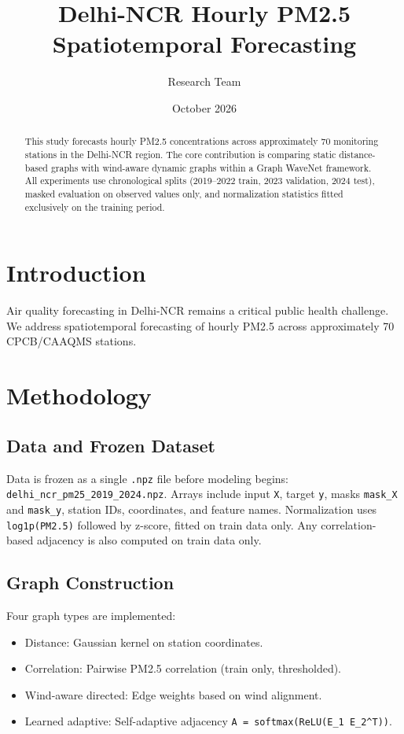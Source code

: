 \documentclass[11pt,a4paper]{article}
\title{Delhi-NCR Hourly PM2.5 Spatiotemporal Forecasting}
\author{Research Team}
\date{October 2026}
\begin{document}
\maketitle

\begin{abstract}
This study forecasts hourly PM2.5 concentrations across approximately 70 monitoring stations in the Delhi-NCR region. The core contribution is comparing static distance-based graphs with wind-aware dynamic graphs within a Graph WaveNet framework. All experiments use chronological splits (2019--2022 train, 2023 validation, 2024 test), masked evaluation on observed values only, and normalization statistics fitted exclusively on the training period.
\end{abstract}

\section{Introduction}

Air quality forecasting in Delhi-NCR remains a critical public health challenge. We address spatiotemporal forecasting of hourly PM2.5 across approximately 70 CPCB/CAAQMS stations.

\section{Methodology}

\subsection{Data and Frozen Dataset}
Data is frozen as a single \texttt{.npz} file before modeling begins: \texttt{delhi\_ncr\_pm25\_2019\_2024.npz}. Arrays include input \texttt{X}, target \texttt{y}, masks \texttt{mask\_X} and \texttt{mask\_y}, station IDs, coordinates, and feature names. Normalization uses \texttt{log1p(PM2.5)} followed by z-score, fitted on train data only. Any correlation-based adjacency is also computed on train data only.

\subsection{Graph Construction}
Four graph types are implemented:
\begin{itemize}
    \item Distance: Gaussian kernel on station coordinates.
    \item Correlation: Pairwise PM2.5 correlation (train only, thresholded).
    \item Wind-aware directed: Edge weights based on wind alignment.
    \item Learned adaptive: Self-adaptive adjacency \texttt{A = softmax(ReLU(E_1 E_2^T))}.
\end{itemize}
\end{document}
